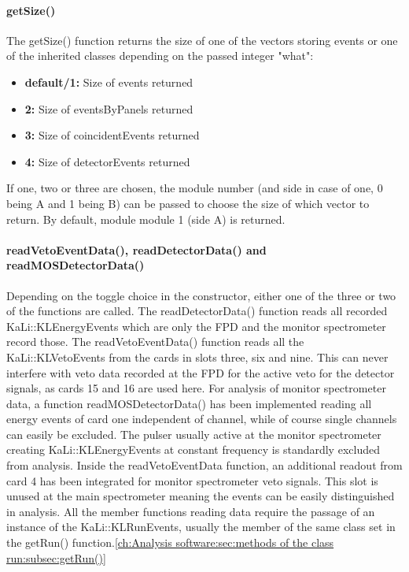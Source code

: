     
    
    \paragraph{getSize()}
    \label{ch:Analysis software:sec:methods of the class run:subsec:getSize()}
    The getSize() function returns the size of one of the vectors storing events or one of the inherited classes depending on the passed integer "what":
    	\begin{itemize}
		
    		\item {\bf default/1:} Size of events returned
    		\item {\bf 2:} Size of eventsByPanels returned
    		\item {\bf 3:} Size of coincidentEvents returned
    		\item {\bf 4:} Size of detectorEvents returned
    	\end{itemize}
	If one, two or three are chosen, the module number (and side in case of one, 0 being A and 1 being B) can be passed to choose the size of which vector to return. By default, module module 1 (side A) is returned.
    
    \paragraph{readVetoEventData(), readDetectorData() and readMOSDetectorData()}
    \label{ch:Analysis software:sec:methods of the class run:subsec:readVetoEventData(), readDetectorData() and readMOSDetectorData()}
    Depending on the toggle choice in the constructor, either one of the three or two of the functions are called. The readDetectorData() function reads all recorded KaLi::\-KLEnergy\-Events which are only the FPD and the monitor spectrometer record those. The readVetoEventData() function reads all the KaLi::KLVetoEvents from the cards in slots three, six and nine. This can never interfere with veto data recorded at the FPD for the active veto for the detector signals, as cards 15 and 16 are used here.
    For analysis of monitor spectrometer data, a function readMOSDetectorData() has been implemented reading all energy events of card one independent of channel, while of course single channels can easily be excluded. The pulser usually active at the monitor spectrometer creating KaLi::KLEnergyEvents at constant frequency is standardly excluded from analysis.
    Inside the readVetoEventData function, an additional readout from card 4 has been integrated for monitor spectrometer veto signals. This slot is unused at the main spectrometer meaning the events can be easily distinguished in analysis.
    All the member functions reading data require the passage of an instance of the KaLi::KLRunEvents, usually the member of the same class set in the getRun() function.\ref{ch:Analysis software:sec:methods of the class run:subsec:getRun()}

    
    
    
    
    
      